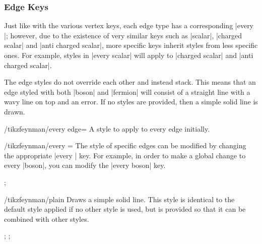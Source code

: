 \documentclass[a4paper,final]{ltxdoc}
\begin{document}
\subsubsection{Edge Keys}
\label{subsubsec:edge_keys}

Just like with the various vertex keys, each edge type has a corresponding |every |; however, due to the existence of very similar keys such as |scalar|, |charged scalar| and |anti charged scalar|, more specific keys inherit styles from less specific ones.  For example, styles in |every scalar| will apply to |charged scalar| and |anti charged scalar|.

The edge styles do not override each other and instead stack.  This means that an edge styled with both |boson| and |fermion| will consist of a straight line with a wavy line on top and an error.  If no styles are provided, then a simple solid line is drawn.

\begin{key}{/tikzfeynman/every edge=}
  A style to apply to every edge initially.
\end{key}

\begin{stylekey}{/tikzfeynman/every =}
  The style of specific edges can be modified by changing the appropriate |every | key.  For example, in order to make a global change to every |boson|, you can modify the |every boson| key.

\begin{codeexample}[]
;
\end{codeexample}
\end{stylekey}

\begin{key}{/tikzfeynman/plain}
  Draws a simple solid line.  This style is identical to the default style applied if no other style is used, but is provided so that it can be combined with other styles.

\begin{codeexample}[]
;
;
\end{codeexample}
\end{key}
\end{document}
